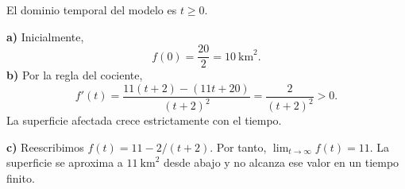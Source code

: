 El dominio temporal del modelo es $t\ge0$.

\textbf{a)} Inicialmente,
\[
 f(0)=\frac{20}{2}=\boxed{10}\ \text{km}^2.
\]
\textbf{b)} Por la regla del cociente,
\[
 f'(t)=\frac{11(t+2)-(11t+20)}{(t+2)^2}
 =\frac2{(t+2)^2}>0.
\]
La superficie afectada crece estrictamente con el tiempo.

\textbf{c)} Reescribimos $f(t)=11-2/(t+2)$. Por tanto, $\lim_{t\to\infty}f(t)=11$. La superficie se aproxima a $\boxed{11}\ \text{km}^2$ desde abajo y no alcanza ese valor en un tiempo finito.
